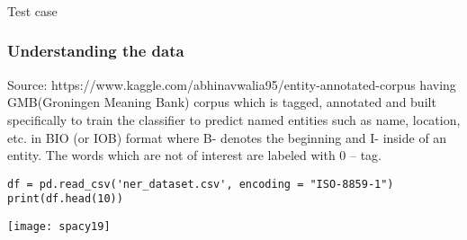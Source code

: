 

	


\begin{frame}[fragile]\frametitle{}

\begin{center}
{\Large Test case}
\end{center}
\end{frame}


\begin{frame}[fragile]\frametitle{Understanding the data}

Source: https://www.kaggle.com/abhinavwalia95/entity-annotated-corpus having GMB(Groningen Meaning Bank) corpus which is tagged, annotated and built specifically to train the classifier to predict named entities such as name, location, etc. in BIO (or IOB) format where  B- denotes the beginning and I- inside of an entity. The words which are not of interest are labeled with 0 – tag.

\begin{lstlisting}
df = pd.read_csv('ner_dataset.csv', encoding = "ISO-8859-1")
print(df.head(10))
\end{lstlisting}


\begin{center}
\texttt{[image: spacy19]}
\end{center}

\end{frame}

